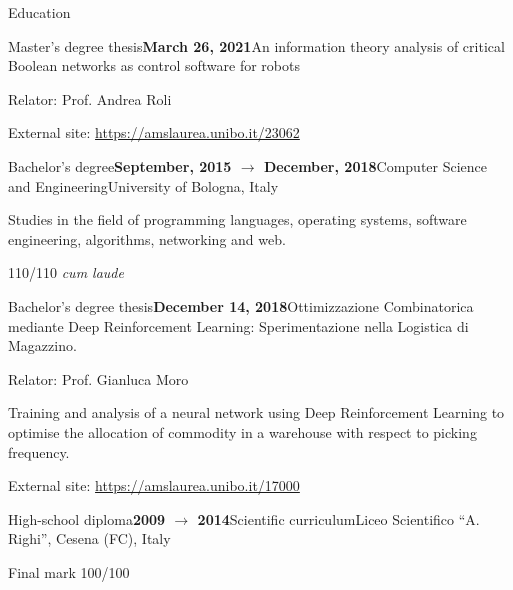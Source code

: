 \documentclass{resume} %
\begin{document}
\begin{rSection}{Education}
\begin{rSubsection}{Master's degree thesis}{\textbf{March 26, 2021}}{An information theory analysis of critical Boolean networks as control software for robots}{\begin{flushright}
                    Relator: Prof. Andrea Roli
            \end{flushright}}
            \item External site: \url{https://amslaurea.unibo.it/23062}
        \end{rSubsection}
        \begin{rSubsection}{Bachelor's degree}{\textbf{September, 2015 $\rightarrow$ December, 2018}}{Computer Science and Engineering}{University of Bologna, Italy}
            \item Studies in the field of programming languages, operating systems, software engineering, algorithms, networking and web.
            \item 110/110 \emph{cum laude}
        \end{rSubsection}
        
        \begin{rSubsection}{Bachelor's degree thesis}{\textbf{December 14, 2018}}{Ottimizzazione Combinatorica mediante Deep Reinforcement Learning: Sperimentazione nella Logistica di Magazzino.}{\begin{flushright}
                    Relator: Prof. Gianluca Moro
            \end{flushright}}
            \item Training and analysis of a neural network using Deep Reinforcement Learning to optimise the allocation of commodity in a warehouse with respect to picking frequency.
            
            \item External site: \url{https://amslaurea.unibo.it/17000}
        \end{rSubsection}
        
        \begin{rSubsection}{High-school diploma}{\textbf{2009 $\rightarrow$ 2014}}{Scientific curriculum}{Liceo Scientifico ``A. Righi'', Cesena (FC), Italy}
            \item Final mark 100/100
        \end{rSubsection}
        
    \end{rSection}
    
    
\end{document}
